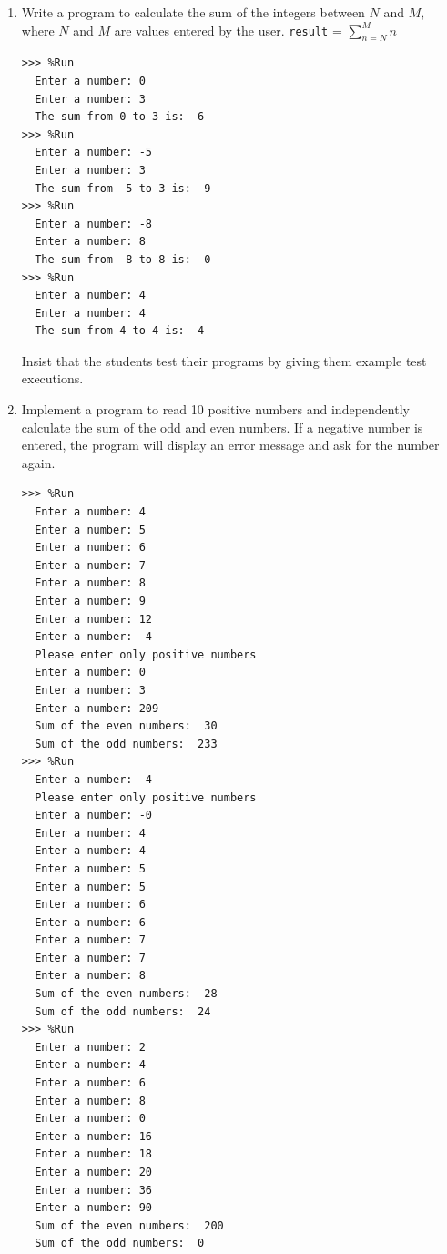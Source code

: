 \documentclass[
  fontsize=10pt,
  a4paper,
]{scrartcl}
\newenvironment{howTILEd}%
  {\begin{mdframed}[skipabove=10pt,skipbelow=10pt,backgroundcolor=pink!40]}%
  {\end{mdframed}}
\begin{document}
\begin{enumerate}

\item Write a program to calculate the sum of the integers between $N$ and $M$, where $N$ and $M$ are values entered by the user.
%
\verb+result+ = $\sum_{n = N}^{M} n$

\begin{Verbatim}[frame=single, label={\em examples of test executions}]
>>> %Run 
  Enter a number: 0
  Enter a number: 3
  The sum from 0 to 3 is:  6
>>> %Run 
  Enter a number: -5
  Enter a number: 3
  The sum from -5 to 3 is: -9
>>> %Run 
  Enter a number: -8
  Enter a number: 8
  The sum from -8 to 8 is:  0
>>> %Run 
  Enter a number: 4
  Enter a number: 4
  The sum from 4 to 4 is:  4
\end{Verbatim}


\begin{howTILEd}
Insist that the students test their programs by giving them example test executions. 
\end{howTILEd}



\item Implement a program to read 10 positive numbers and independently calculate the sum of the odd and even numbers. If a negative number is entered, the program will display an error message and ask for the number again.

\begin{Verbatim}[frame=single, label={\em examples of test executions}]
>>> %Run 
  Enter a number: 4
  Enter a number: 5
  Enter a number: 6
  Enter a number: 7
  Enter a number: 8
  Enter a number: 9
  Enter a number: 12
  Enter a number: -4
  Please enter only positive numbers
  Enter a number: 0
  Enter a number: 3
  Enter a number: 209
  Sum of the even numbers:  30
  Sum of the odd numbers:  233
>>> %Run
  Enter a number: -4
  Please enter only positive numbers
  Enter a number: -0
  Enter a number: 4
  Enter a number: 4
  Enter a number: 5
  Enter a number: 5
  Enter a number: 6
  Enter a number: 6
  Enter a number: 7
  Enter a number: 7
  Enter a number: 8
  Sum of the even numbers:  28
  Sum of the odd numbers:  24
>>> %Run 
  Enter a number: 2
  Enter a number: 4
  Enter a number: 6
  Enter a number: 8
  Enter a number: 0
  Enter a number: 16
  Enter a number: 18
  Enter a number: 20
  Enter a number: 36
  Enter a number: 90
  Sum of the even numbers:  200
  Sum of the odd numbers:  0
\end{Verbatim}


\end{enumerate}
\end{document}
